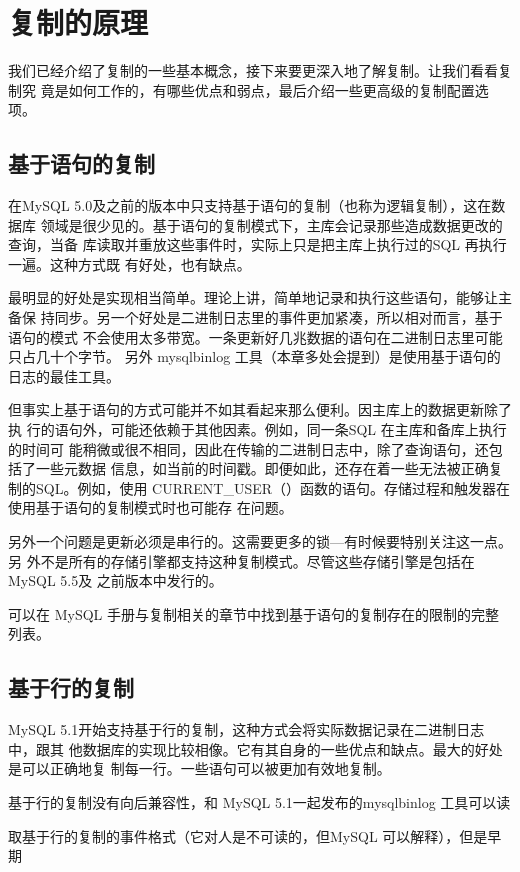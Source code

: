 \section{复制的原理}
我们已经介绍了复制的一些基本概念，接下来要更深入地了解复制。让我们看看复制究
竟是如何工作的，有哪些优点和弱点，最后介绍一些更高级的复制配置选项。

\subsection{基于语句的复制}
在MySQL 5.0及之前的版本中只支持基于语句的复制（也称为逻辑复制），这在数据库
领域是很少见的。基于语句的复制模式下，主库会记录那些造成数据更改的查询，当备
库读取并重放这些事件时，实际上只是把主库上执行过的SQL 再执行一遍。这种方式既
有好处，也有缺点。

最明显的好处是实现相当简单。理论上讲，简单地记录和执行这些语句，能够让主备保
持同步。另一个好处是二进制日志里的事件更加紧凑，所以相对而言，基于语句的模式
不会使用太多带宽。一条更新好几兆数据的语句在二进制日志里可能只占几十个字节。
另外 mysqlbinlog 工具（本章多处会提到）是使用基于语句的日志的最佳工具。

但事实上基于语句的方式可能并不如其看起来那么便利。因主库上的数据更新除了执
行的语句外，可能还依赖于其他因素。例如，同一条SQL 在主库和备库上执行的时间可
能稍微或很不相同，因此在传输的二进制日志中，除了查询语句，还包括了一些元数据
信息，如当前的时间戳。即便如此，还存在着一些无法被正确复制的SQL。例如，使用
CURRENT\_USER（）函数的语句。存储过程和触发器在使用基于语句的复制模式时也可能存
在问题。

另外一个问题是更新必须是串行的。这需要更多的锁—有时候要特别关注这一点。另
外不是所有的存储引擎都支持这种复制模式。尽管这些存储引擎是包括在 MySQL 5.5及
之前版本中发行的。

可以在 MySQL 手册与复制相关的章节中找到基于语句的复制存在的限制的完整列表。

\subsection{基于行的复制}
MySQL 5.1开始支持基于行的复制，这种方式会将实际数据记录在二进制日志中，跟其
他数据库的实现比较相像。它有其自身的一些优点和缺点。最大的好处是可以正确地复
制每一行。一些语句可以被更加有效地复制。

基于行的复制没有向后兼容性，和 MySQL 5.1一起发布的mysqlbinlog 工具可以读

取基于行的复制的事件格式（它对人是不可读的，但MySQL 可以解释），但是早期


